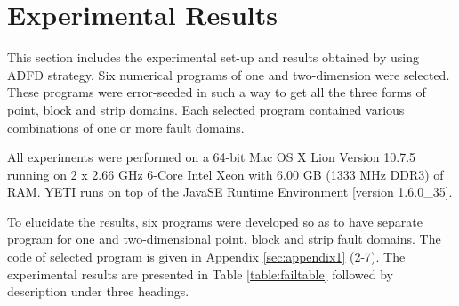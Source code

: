 
\section{Experimental Results} \label{sec:experimentalResults}
This section includes the experimental set-up and results obtained by using ADFD strategy. Six numerical programs of one and two-dimension were selected. These programs were error-seeded in such a way to get all the three forms of point, block and strip domains. Each selected program contained various combinations of one or more fault domains. 

All experiments were performed on a 64-bit Mac OS X Lion Version 10.7.5 running on 2 x 2.66 GHz 6-Core Intel Xeon with 6.00 GB (1333 MHz DDR3) of RAM. YETI runs on top of the Java\texttrademark  SE Runtime Environment [version 1.6.0\_35]. 

To elucidate the results, six programs were developed so as to have separate program for one and two-dimensional point, block and strip fault domains. The code of selected program is given in Appendix \ref{sec:appendix1} (2-7). The experimental results are presented in Table \ref{table:failtable} followed by description under three headings.


